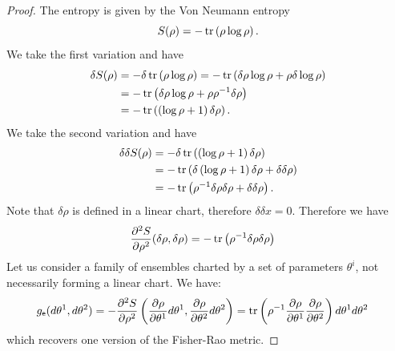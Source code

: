 \begin{proof}
	The entropy is given by the Von Neumann entropy
	\begin{equation}
		S(\rho) = - \operatorname{tr}\left(\rho \log \rho\right).
	\end{equation}
	We take the first variation and have
	\begin{equation}
		\begin{aligned}
			\delta S(\rho) &= - \delta \operatorname{tr}\left(\rho \log \rho\right)= - \operatorname{tr}\left(\delta \rho \log \rho + \rho \delta \log \rho\right) \\
			&= - \operatorname{tr}\left(\delta \rho \log \rho + \rho \rho^{-1} \delta \rho \right) \\
			&= - \operatorname{tr}\left(\left(\log \rho + 1 \right) \delta \rho \right).
		\end{aligned}
	\end{equation}
	We take the second variation and have
	\begin{equation}
		\begin{aligned}
			\delta \delta S(\rho) &= - \delta \operatorname{tr}\left(\left(\log \rho + 1 \right) \delta \rho \right) \\
			&= - \operatorname{tr}\left(\delta \left(\log \rho + 1 \right) \delta \rho + \delta \delta \rho \right) \\
			&= - \operatorname{tr}\left(\rho^{-1} \delta \rho \delta \rho + \delta \delta \rho \right).
		\end{aligned}
	\end{equation}
	Note that $\delta \rho$ is defined in a linear chart, therefore $\delta \delta x = 0$. Therefore we have 
	\begin{equation}
	\begin{aligned}
		\frac{\partial^2 S}{\partial \rho^2}(\delta \rho, \delta \rho) &= - \operatorname{tr}\left(\rho^{-1} \delta \rho \delta \rho \right)
	\end{aligned}
\end{equation}
	Let us consider a family of ensembles charted by a set of parameters $\theta^i$, not necessarily forming a linear chart. We have:
\begin{equation}
	\begin{aligned}
		g_{\mathsf{e}}(d\theta^1, d\theta^2) &= - \frac{\partial^2 S}{\partial \rho^2}\left(\frac{\partial 
			\rho}{\partial \theta^1} d\theta^1, \frac{\partial 
			\rho}{\partial \theta^2} d\theta^2\right) = \operatorname{tr}\left( \rho^{-1} \frac{\partial \rho}{\partial \theta^1 }\frac{\partial \rho}{\partial \theta^2}\right) d\theta^1 d\theta^2
	\end{aligned}
\end{equation}
which recovers one version of the Fisher-Rao metric.


\end{proof}
